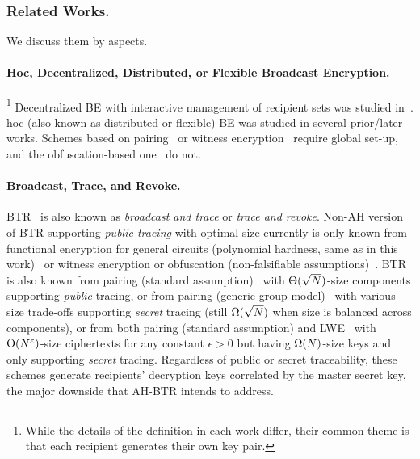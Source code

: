\subsubsection{Related Works.}
We discuss them by aspects.

\paragraph{\Ad Hoc, Decentralized, Distributed, or Flexible
Broadcast Encryption.}
\leavevmode\unskip\footnote{
While the details of the definition in each work differ,
their common theme is that each recipient generates their own key pair.}
Decentralized BE
with interactive management of recipient sets
was studied in~\cite{SCN:PhaPoiStr12,PAIRING:DelPaiPoi07}.
\Ad hoc (also known as distributed or flexible) BE
was studied in several prior/later works.
Schemes based on
pairing~\cite{DHMR08,CCS:WQZD10,AC:KolMalWee23} or
witness encryption~\cite{C:FreWatWu23}
require global set-up, and
the obfuscation-based one~\cite{C:BonZha14} do not.

\paragraph{Broadcast, Trace, and Revoke.}
BTR~\cite{FC:NaoPin00,C:NaoNaoLot01} is also known as
\emph{broadcast and trace} or \emph{trace and revoke}.
Non-AH version of BTR supporting \emph{public tracing} with optimal size
currently is only known from
functional encryption for general circuits
(polynomial hardness, same as in this work)~\cite{EC:AKYY23,EC:JaiLinLuo23}
or witness encryption or obfuscation
(non-falsifiable assumptions)~\cite{EC:NisWicZha16,PKC:GoyVusWat19}.
BTR is also known
from pairing (standard assumption)~\cite{CCS:BonWat06,CCS:GKSW10}
with $\operatorname{\Theta}(\sqrt{N})$-size components supporting \emph{public} tracing,
or from pairing (generic group model)~\cite{C:Zhandry20}
with various size trade-offs supporting \emph{secret} tracing
(still $\operatorname{\Omega}(\sqrt{N})$ when size is balanced across components),
or from both pairing (standard assumption) and LWE~\cite{C:GQWW19}
with $\operatorname{O}(N^\varepsilon)$-size ciphertexts for any constant ${\epsilon>0}$
but having $\operatorname{\Omega}(N)$-size keys and only supporting \emph{secret} tracing.
Regardless of public or secret traceability,
these schemes generate recipients' decryption keys
correlated by the master secret key,
the major downside that AH-BTR intends to address.

